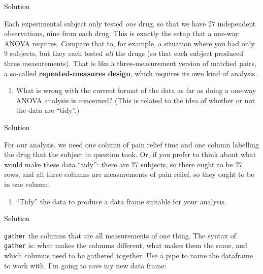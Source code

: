\documentclass[]{tufte-book}
\newenvironment{Shaded}{}{}
\newcommand{\KeywordTok}[1]{\textcolor[rgb]{0.00,0.44,0.13}{\textbf{#1}}}
\newcommand{\NormalTok}[1]{#1}
\newcommand{\OperatorTok}[1]{\textcolor[rgb]{0.40,0.40,0.40}{#1}}
\newcommand{\StringTok}[1]{\textcolor[rgb]{0.25,0.44,0.63}{#1}}
\providecommand{\tightlist}{%
  \setlength{\itemsep}{0pt}\setlength{\parskip}{0pt}}
\theoremstyle{definition}
\theoremstyle{definition}
\theoremstyle{definition}
\theoremstyle{remark}
\begin{document}
Solution

Each experimental subject only tested \emph{one} drug, so that we have
27 independent observations, nine from each drug. This is exactly the
setup that a one-way ANOVA requires. Compare that to, for example, a
situation where you had only 9 subjects, but they each tested \emph{all}
the drugs (so that each subject produced three measurements). That is
like a three-measurement version of matched pairs, a so-called
\textbf{repeated-measures design}, which requires its own kind of
analysis.

\begin{enumerate}
\def\labelenumi{(\alph{enumi})}
\setcounter{enumi}{2}
\tightlist
\item
  What is wrong with the current format of the data as far as doing a
  one-way ANOVA analysis is concerned? (This is related to the idea of
  whether or not the data are ``tidy''.)
\end{enumerate}

Solution

For our analysis, we need one column of pain relief time and one column
labelling the drug that the subject in question took. Or, if you prefer
to think about what would make these data ``tidy'': there are 27
subjects, so there ought to be 27 rows, and all three columns are
measurements of pain relief, so they ought to be in one column.

\begin{enumerate}
\def\labelenumi{(\alph{enumi})}
\setcounter{enumi}{3}
\tightlist
\item
  ``Tidy'' the data to produce a data frame suitable for your analysis.
\end{enumerate}

Solution

\texttt{gather} the columns that are all measurements of one thing. The
syntax of \texttt{gather} is: what makes the columns different, what
makes them the same, and which columns need to be gathered together. Use
a pipe to name the dataframe to work with. I'm going to save my new data
frame:

\begin{Shaded}
\end{Shaded}
\end{document}
